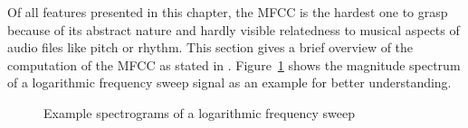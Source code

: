 Of all features presented in this chapter, the MFCC is the hardest one to grasp because of its abstract nature and hardly visible relatedness to musical aspects of audio files like pitch or rhythm. This section gives a brief overview of the computation of the MFCC as stated in \cite[pp. 55ff]{knees1}.
Figure~\ref{sweep} shows the magnitude spectrum of a logarithmic frequency sweep signal as an example for better understanding.
\begin{figure}[htbp]
	\centering
	\caption{Example spectrograms of a logarithmic frequency sweep}	
	\label{sweep}
\end{figure}
